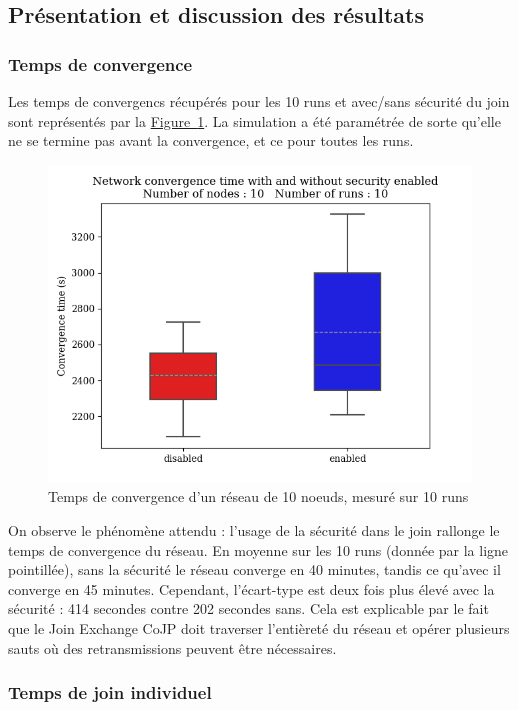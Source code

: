 \documentclass[]{report}
\newcommand{\wordlink}[2]{\hyperref[#2]{#1~\ref{#2}}}
\begin{document}
\subsection{Présentation et discussion des résultats}

\subsubsection{Temps de convergence}

Les temps de convergencs récupérés pour les 10 runs et avec/sans sécurité du join sont représentés par la \wordlink{Figure}{fig:convergence}. La simulation a été paramétrée de sorte qu'elle ne se termine pas avant la convergence, et ce pour toutes les runs.

	\begin{figure}[!h]
	\centering
	\includegraphics[width=0.7\linewidth]{results/secjoin/boxesTimeConvergence10.png}
	\caption{Temps de convergence d'un réseau de 10 noeuds, mesuré sur 10 runs}
	\label{fig:convergence}
	\end{figure}

\vspace{0.1cm}
On observe le phénomène attendu : l'usage de la sécurité dans le join rallonge le temps de convergence du réseau. En moyenne sur les 10 runs (donnée par la ligne pointillée), sans la sécurité le réseau converge en 40 minutes, tandis ce qu'avec il converge en 45 minutes. Cependant, l'écart-type est deux fois plus élevé avec la sécurité : 414 secondes contre 202 secondes sans. Cela est explicable par le fait que le Join Exchange CoJP doit traverser l'entièreté du réseau et opérer plusieurs sauts où des retransmissions peuvent être nécessaires.

\newpage


\subsubsection{Temps de join individuel}
\end{document}
